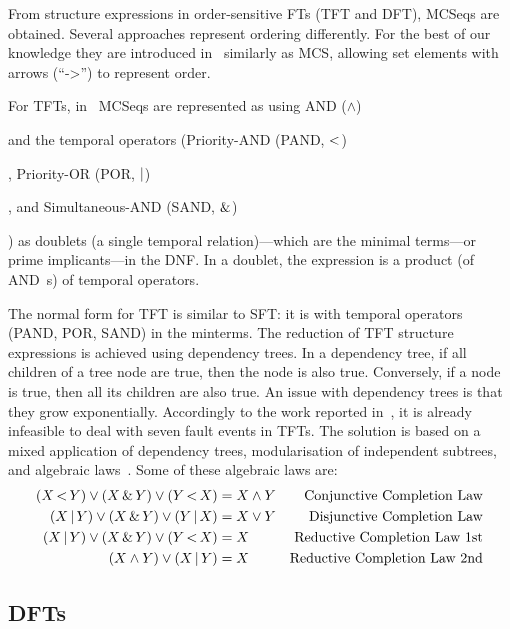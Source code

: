 \documentclass[en,twoside,onehalfspacing,phd]{risethesis}
\def\andtext{AND ($\land$)%
  \gdef\andtext{AND\xspace}%
  \xspace
}
\def\pandtext{Priority-AND (PAND, $\pand$)%
  \gdef\pandtext{PAND\xspace}%
  \xspace
}
\def\portext{Priority-OR (POR, $\por$)%
  \gdef\portext{POR\xspace}%
  \xspace
}
\def\sandtext{Simultaneous-AND (SAND, $\sand$)%
  \gdef\sandtext{SAND\xspace}%
  \xspace
}
\newcommand{\parsin}[1]{\ensuremath\left( #1 \right)}
\def\pand{\ensuremath\operatorname{<}}
\def\por{\ensuremath\operatorname{|}}
\def\sand{\ensuremath\operatorname{\&}}
\begin{document}
From structure expressions in order-sensitive \acp{FT} (\ac{TFT} and \ac{DFT}), \acp{MCSeq} are obtained.
Several approaches represent  ordering differently.
For the best of our knowledge they are introduced in~\cite{TD2004} similarly as \ac{MCS}, allowing set elements with arrows (``->'') to represent order.

For \acp{TFT}, in~\cite{Walker2009} \acp{MCSeq} are represented as  using \andtext and the temporal operators (\pandtext, \portext, and \sandtext) as doublets (a single temporal relation)---which are the minimal terms---or prime implicants---in the \ac{DNF}.
In a doublet, the expression is a product (of \andtext\ s) of temporal operators.

The normal form for \ac{TFT} is similar to \ac{SFT}: it is  with temporal operators (\pandtext, \portext, \sandtext) in the minterms.
The reduction of \ac{TFT} structure expressions is achieved using dependency trees.
In a dependency tree, if all children of a tree node are true, then the node is also true.
Conversely, if a node is true, then all its children are also true.
An issue with dependency trees is that they grow exponentially.
Accordingly to the work reported in~\cite{WP2010}, it is already infeasible to deal with seven fault events in TFTs.
The solution is based on a mixed application of dependency trees, modularisation of independent subtrees, and algebraic laws~\cite{WP2009}.
Some of these algebraic laws are:
%
\begin{subequations}
\begin{align}
  \parsin{X \pand Y} \lor \parsin{X \sand Y} \lor \parsin{Y \pand X} &= X \land Y & \text{Conjunctive Completion Law}\label{law:tft-conjunctive-completion-law}\\
  \parsin{X \por Y} \lor \parsin{X \sand Y} \lor \parsin{Y \por X} &= X \lor Y & \text{Disjunctive Completion Law}\\
  \parsin{X \por Y} \lor \parsin{X \sand Y} \lor \parsin{Y \pand X} &= X & \text{Reductive Completion Law 1st}\\
  \parsin{X \land Y} \lor \parsin{X \por Y}  &= X & \text{Reductive Completion Law 2nd}
\end{align}
\end{subequations}

\subsection{\Aclp{DFT}}
\label{sec:dynamic-fault-trees}
\end{document}
